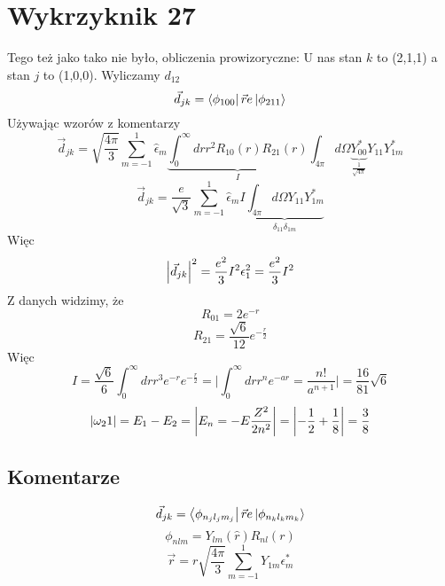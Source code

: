 \documentclass[a4paper,12pt]{article}
\begin{document}
\section{Wykrzyknik 27}
Tego też jako tako nie było, obliczenia prowizoryczne:
U nas stan $k$ to (2,1,1) a stan $j$ to (1,0,0).
Wyliczamy $d_{12}$
\begin{equation*}
  \vec{d}_{jk} = \bra{\phi_{100}} \vec{r}e \ket{\phi_{211}}
\end{equation*}
Używając wzorów z komentarzy
\begin{equation*}
  \vec{d}_{jk} = \sqrt{\frac{4\pi}{3}} \sum_{m=-1}^1 \hat{\epsilon}_m  
  \underbrace{\int_0^\infty dr r^2 R_{10}(r) R_{21}(r)}_{I} \int_{4\pi} d\Omega
  \underbrace{Y_{00}^*}_{\frac{1}{\sqrt{4\pi}}}Y_{11} 
  Y_{1m}^* 
\end{equation*}
\begin{equation*}
  \vec{d}_{jk} = \frac{e}{\sqrt{3}}\sum_{m=-1}^1 \hat{\epsilon}_m I
  \underbrace{\int_{4\pi} d\Omega Y_{11} Y_{1m}^*}_{\delta_{11} \delta_{1m}}
\end{equation*}
Więc
\begin{equation*}
  \abs{\vec{d}_{jk}}^2 = \frac{e^2}{3} I^2 \epsilon_1^2 = \frac{e^2}{3} I^2 
\end{equation*}
Z danych widzimy, że 
\begin{equation*}
  R_{01} = 2e^{-r}
\end{equation*}
\begin{equation*}
  R_{21} = \frac{\sqrt{6}}{12}e^{-\frac{r}{2}}
\end{equation*}
Więc
\begin{equation*}
  I = \frac{\sqrt{6}}{6} \int_0^\infty dr r^3 e^{-r} e^{-\frac{r}{2}} = \bigg
  \vert \int_0^\infty dr r^n e^{-ar} = \frac{n!}{a^{n+1}} \bigg \vert =
  \frac{16}{81} \sqrt{6}
\end{equation*}
\begin{equation*}
  \abs{\omega_21} = E_1 - E_2 = \bigg \vert E_n = -E \frac{Z^2}{2n^2} \bigg
  \vert = \abs{- \frac{1}{2} + \frac{1}{8}} = \frac{3}{8}
\end{equation*}

\subsection{Komentarze}
\begin{equation*}
  \vec{d}_{jk} = \bra{\phi_{n_j l_j m_j}} \vec{r}e \ket{ \phi_{n_k l_k m_k}}
\end{equation*}
\begin{equation*}
  \phi_{nlm} = Y_{lm} (\hat{r}) R_{nl} (r)
\end{equation*}
\begin{equation*}
  \vec{r} = r \sqrt{\frac{4\pi}{3}} \sum_{m=-1}^1 Y_{1m} \epsilon_{m}^{*}
\end{equation*}
\end{document}

